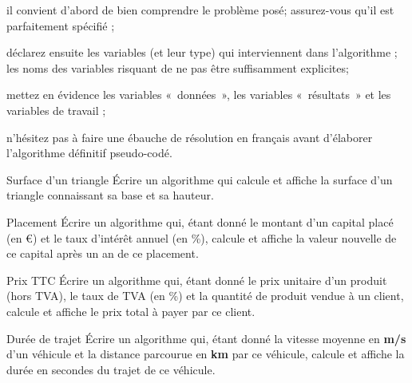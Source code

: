 	\begin{liste}
	\item {
		il convient d’abord de bien comprendre le problème posé; assurez-vous
		qu’il est parfaitement spécifié ;}
	\item {
		déclarez ensuite les variables (et leur type) qui interviennent dans
		l’algorithme ; les noms des variables risquant de ne pas être
		suffisamment explicites;}
	\item {
		mettez en évidence les variables «~données~», les variables
		«~résultats~» et les variables de travail ;}
	\item {
		n’hésitez pas à faire une ébauche de résolution en français avant
		d’élaborer l’algorithme définitif pseudo-codé.}
	\end{liste}

\begin{Exercice}{Surface d’un triangle}
	Écrire un algorithme qui calcule et affiche la surface
	d’un triangle connaissant sa base et sa hauteur.
	
	\begin{Solution}
	\end{Solution}
\end{Exercice}

\begin{Exercice}{Placement}
	Écrire un algorithme qui, étant donné le montant d’un capital placé (en
	€) et le taux d’intérêt annuel (en \%), calcule et affiche la valeur
	nouvelle de ce capital après un an de ce placement.
\end{Exercice}

\begin{Exercice}{Prix TTC}
	Écrire un algorithme qui, étant donné le prix unitaire d’un produit
	(hors TVA), le taux de TVA (en \%) et la quantité de produit vendue à
	un client, calcule et affiche le prix total à payer par ce client.
\end{Exercice}

\begin{Exercice}{Durée de trajet}
	Écrire un algorithme qui, étant donné la vitesse moyenne en \textbf{m/s}
	d’un véhicule et la distance parcourue en \textbf{km} par ce véhicule,
	calcule et affiche la durée en secondes du trajet de ce véhicule.
\end{Exercice}

